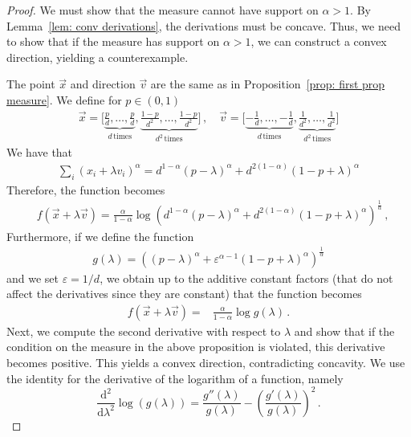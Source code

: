\documentclass[aps,pra,11pt,onecolumn,nofootinbib,tightenlines]{revtex4-2}
\theoremstyle{definition}
\def \d {\mathrm{d}}
\begin{document}
 \begin{proof}
 We must show that the measure cannot have support on $\alpha > 1$. By Lemma~\ref{lem: conv derivations}, the derivations must be concave. Thus, we need to show that if the measure has support on $\alpha > 1$, we can construct a convex direction, yielding a counterexample.  

 The point $\vec{x}$ and direction $\vec{v}$ are the same as in Proposition~\ref{prop: first prop measure}. We define for $p \in (0,1)$
\begin{align}
 \vec{x}=\bigg[\underbrace{\frac{p}{d},\ldots,\frac{p}{d}}_{d\,\textrm{times}},\underbrace{\frac{1-p}{d^2},\ldots,\frac{1-p}{d^2}}_{d^2\,\textrm{times}}\bigg] \,,
 \quad 
\vec{v}=\bigg[\underbrace{-\frac{1}{d},\ldots,-\frac{1}{d}}_{d\,\textrm{times}},\underbrace{\frac{1}{d^2},\ldots,\frac{1}{d^2}}_{d^2\,\textrm{times}}\bigg]
 \end{align}
 We have that
 \begin{align}
     \sum_i (x_i+\lambda v_i)^\alpha = d^{1-\alpha}(p-\lambda)^\alpha+d^{2(1-\alpha)}(1-p+\lambda)^\alpha
 \end{align}
 Therefore, the function becomes
 \begin{align}
   &f(\vec{x}+\lambda \vec{v}) =  \frac{\alpha}{1-\alpha}\log{\left(d^{1-\alpha}(p-\lambda)^\alpha+d^{2(1-\alpha)}(1-p+\lambda)^\alpha\right)^\frac{1}{\alpha}} \,,
 \end{align}
 Furthermore, if we define the function
 \begin{align} g(\lambda)=\left((p-\lambda)^\alpha+\varepsilon^{\alpha-1}(1-p+\lambda)^\alpha\right)^\frac{1}{\alpha}
 \end{align}
 and we set $\varepsilon =1/d$, we obtain up to the additive constant factors (that do not affect the derivatives since they are constant)
 that the function becomes
 \begin{align}
 f(\vec{x}+\lambda\vec{v}) = &\frac{\alpha}{1-\alpha}\log{g(\lambda)} \,.
 \end{align}
 Next, we compute the second derivative with respect to $\lambda$ and show that if the condition on the measure in the above proposition is violated, this derivative becomes positive. This yields a convex direction, contradicting concavity. We use the identity for the derivative of the logarithm of a function, namely
 \begin{equation}
 \frac{\d^2}{\d\lambda^2} \log(g(\lambda)) = \frac{g''(\lambda)}{g(\lambda)} - \left( \frac{g'(\lambda)}{g(\lambda)} \right)^2 \,.
 \end{equation}

\end{proof}
\end{document}
